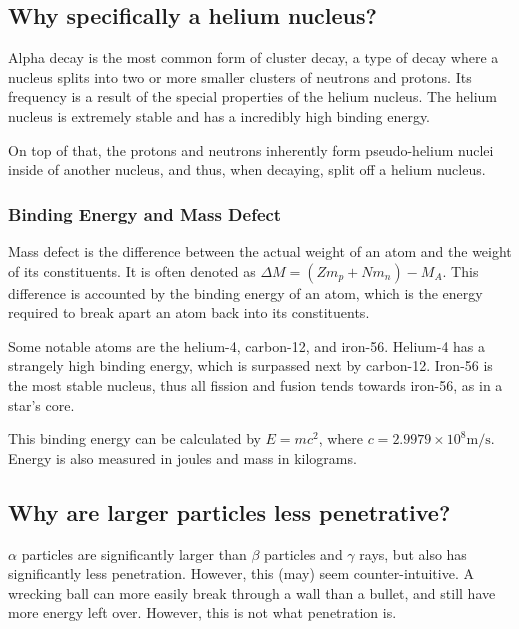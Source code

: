 \documentclass[
]{article}
\begin{document}
\hypertarget{why-specifically-a-helium-nucleus}{%
\subsection{Why specifically a helium
nucleus?}\label{why-specifically-a-helium-nucleus}}

Alpha decay is the most common form of cluster decay, a type of decay
where a nucleus splits into two or more smaller clusters of neutrons and
protons. Its frequency is a result of the special properties of the
helium nucleus. The helium nucleus is extremely stable and has a
incredibly high binding energy.

On top of that, the protons and neutrons inherently form pseudo-helium
nuclei inside of another nucleus, and thus, when decaying, split off a
helium nucleus.

\hypertarget{binding-energy-and-mass-defect}{%
\subsubsection{Binding Energy and Mass
Defect}\label{binding-energy-and-mass-defect}}

Mass defect is the difference between the actual weight of an atom and
the weight of its constituents. It is often denoted as
{\(\Delta M = (Zm_{p} + Nm_{n}) - M_{A}\)}. This difference is accounted
by the binding energy of an atom, which is the energy required to break
apart an atom back into its constituents.

Some notable atoms are the helium-4, carbon-12, and iron-56. Helium-4
has a strangely high binding energy, which is surpassed next by
carbon-12. Iron-56 is the most stable nucleus, thus all fission and
fusion tends towards iron-56, as in a star's core.

This binding energy can be calculated by {\(E = mc^{2}\)}, where
{\(c = 2.9979 \times 10^{8}\text{m/s}\)}. Energy is also measured in
joules and mass in kilograms.

\hypertarget{why-are-larger-particles-less-penetrative}{%
\subsection{Why are larger particles less
penetrative?}\label{why-are-larger-particles-less-penetrative}}

{\(\alpha\)} particles are significantly larger than {\(\beta\)}
particles and {\(\gamma\)} rays, but also has significantly less
penetration. However, this (may) seem counter-intuitive. A wrecking ball
can more easily break through a wall than a bullet, and still have more
energy left over. However, this is not what penetration is.
\end{document}
